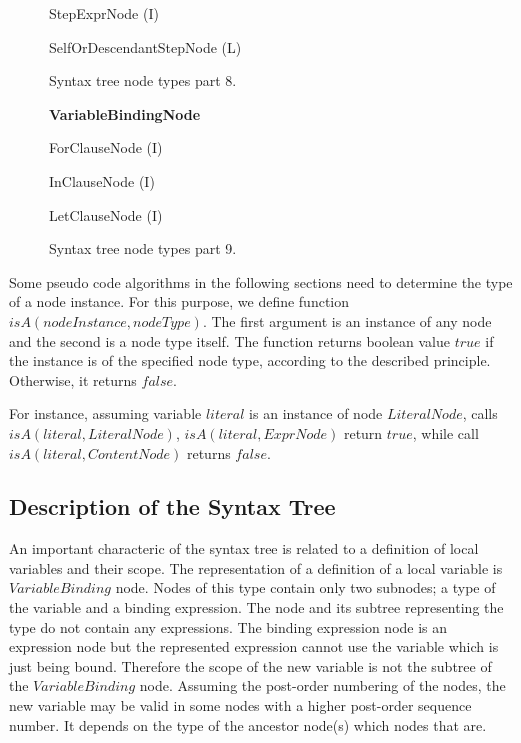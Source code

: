 \begin{figure}
\caption{Syntax tree node types part 8.}
\label{FIG_syntax_tree_node_types_part_8}
\begin{description}
\item StepExprNode (I)
  \begin{description}
  \item SelfOrDescendantStepNode (L)
  \end{description}
\end{description}
\end{figure}

\begin{figure}
\caption{Syntax tree node types part 9.}
\label{FIG_syntax_tree_node_types_part_9}
\begin{description}
\item \textbf{VariableBindingNode}
  \begin{description}
  \item ForClauseNode (I)
  \item InClauseNode (I)
  \item LetClauseNode (I)
  \end{description}
\end{description}
\end{figure}

Some pseudo code algorithms in the following sections need to determine the type of a node instance. For this purpose, we define function $isA(nodeInstance, nodeType)$. The first argument is an instance of any node and the second is a node type itself. The function returns boolean value $true$ if the instance is of the specified node type, according to the described principle. Otherwise, it returns $false$.

For instance, assuming variable $literal$ is an instance of node $LiteralNode$, calls $isA(literal, LiteralNode)$, $isA(literal, ExprNode)$ return $true$, while call $isA(literal, ContentNode)$ returns $false$.

\subsection{Description of the Syntax Tree}
An important characteric of the syntax tree is related to a definition of local variables and their scope. The representation of a definition of a local variable is $VariableBinding$ node. Nodes of this type contain only two subnodes; a type of the variable and a binding expression. The node and its subtree representing the type do not contain any expressions. The binding expression node is an expression node but the represented expression cannot use the variable which is just being bound. Therefore the scope of the new variable is not the subtree of the $VariableBinding$ node. Assuming  the post-order numbering of the nodes, the new variable may be valid in some nodes with a higher post-order sequence number. It depends on the type of the ancestor node(s) which nodes that are.


